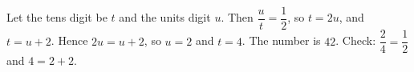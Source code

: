 Let the tens digit be $t$ and the units digit $u$. Then $\dfrac{u}{t}=\dfrac{1}{2}$, so $t=2u$, and $t=u+2$. Hence $2u=u+2$, so $u=2$ and $t=4$. The number is $\boxed{42}$. Check: $\dfrac{2}{4}=\dfrac{1}{2}$ and $4=2+2$.
